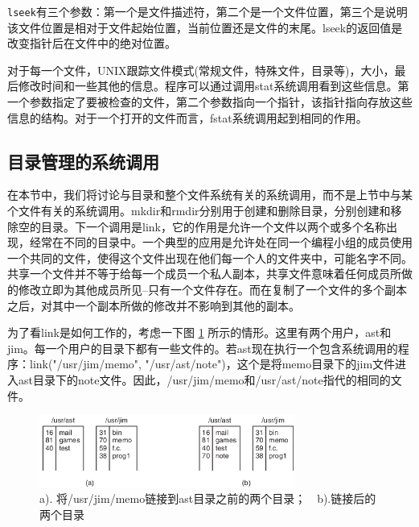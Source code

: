 	\texttt{lseek}有三个参数：第一个是文件描述符，第二个是一个文件位置，第三个是说明该文件位置是相对于文件起始位置，当前位置还是文件的末尾。lseek的返回值是改变指针后在文件中的绝对位置。
	
	对于每一个文件，UNIX跟踪文件模式(常规文件，特殊文件，目录等)，大小，最后修改时间和一些其他的信息。程序可以通过调用stat系统调用看到这些信息。第一个参数指定了要被检查的文件，第二个参数指向一个指针，该指针指向存放这些信息的结构。对于一个打开的文件而言，fstat系统调用起到相同的作用。
	
	\subsection{目录管理的系统调用}
	
	在本节中，我们将讨论与目录和整个文件系统有关的系统调用，而不是上节中与某个文件有关的系统调用。mkdir和rmdir分别用于创建和删除目录，分别创建和移除空的目录。下一个调用是link，它的作用是允许一个文件以两个或多个名称出现，经常在不同的目录中。一个典型的应用是允许处在同一个编程小组的成员使用一个共同的文件，使得这个文件出现在他们每一个人的文件夹中，可能名字不同。共享一个文件并不等于给每一个成员一个私人副本，共享文件意味着任何成员所做的修改立即为其他成员所见--只有一个文件存在。而在复制了一个文件的多个副本之后，对其中一个副本所做的修改并不影响到其他的副本。
	
	为了看link是如何工作的，考虑一下图 \ref{fig:link} 所示的情形。这里有两个用户，ast和jim。每一个用户的目录下都有一些文件的。若ast现在执行一个包含系统调用的程序：link("/usr/jim/memo", "/usr/ast/note")，这个是将memo目录下的jim文件进入ast目录下的note文件。因此，/usr/jim/memo和/usr/ast/note指代的相同的文件。
	
	\begin{figure}[ht]\small
		\centering
		\includegraphics[width=0.75\textwidth]{FIG/1-21.png}
		\caption{a). 将/usr/jim/memo链接到ast目录之前的两个目录；　b).链接后的两个目录}\label{fig:link}
	\end{figure}
	
